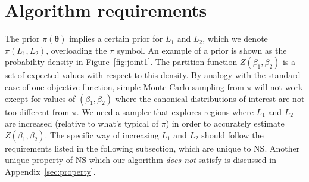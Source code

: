 \documentclass[entropy,article,submit,moreauthors,pdftex,10pt,a4paper]{Definitions/mdpi}
\newcommand{\xx}{\boldsymbol{\theta}}
\begin{document}
\section{Algorithm requirements}
The prior $\pi(\xx)$ implies a certain prior for $L_1$ and $L_2$, which we
denote $\pi(L_1, L_2)$, overloading the $\pi$ symbol.
An example of a prior is shown as the
probability density in Figure~\ref{fig:joint1}. The partition function
$Z(\beta_1, \beta_2)$ is a set of expected values with respect to this density.
By analogy with the standard case of one objective function,
simple Monte Carlo sampling from $\pi$ will not work except for values of
$(\beta_1, \beta_2)$ where the canonical distributions of interest are
not too different from $\pi$.
We need a sampler that explores regions where $L_1$ and $L_2$ are increased
(relative to what's typical of $\pi$) in order
to accurately estimate $Z(\beta_1, \beta_2)$. The specific way of increasing
$L_1$ and $L_2$ should follow the requirements listed in the following
subsection, which are unique to NS. Another unique property of NS which our
algorithm {\em does not} satisfy is discussed in Appendix~\ref{sec:property}.



\end{document}
